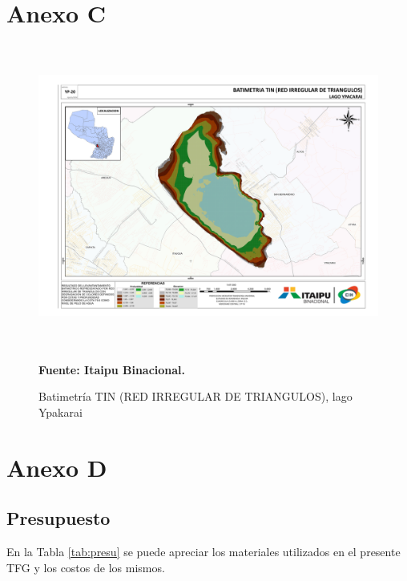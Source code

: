 \begin{appendices}
\chapter*{Anexo C}
\begin{figure}[ht]
    \centering
    \includegraphics[width=150mm, height=100mm]{Imagenes/cap3/Batimetria_lago_Ypacarai_TIN_A3.pdf}
    \caption[BATIMETRIA TIN lago Ypakarai]{Batimetr\'ia TIN (RED IRREGULAR DE TRIANGULOS), lago Ypakarai} \textbf{Fuente: Itaipu Binacional.}
    \label{fig:ModuloFrontal}
\end{figure}


\chapter*{Anexo D}
\section[Presupuesto]{Presupuesto}
En la Tabla \ref{tab:presu} se puede apreciar los materiales utilizados en el presente TFG y los costos de los mismos.


\end{appendices}

